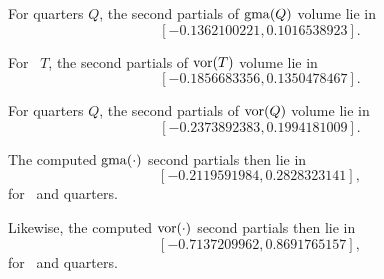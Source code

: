 \begin{calcf}
For quarters $Q$, the second partials of $\operatorname{gma}(Q)$ volume lie in
\[
[-0.1362100221,   0.1016538923].
\]
\label{secpar:gma}
\end{calcf}

\begin{calcf}
For \qrtets\ $T$, the second partials of $\operatorname{vor}(T)$ volume lie in
\[
[-0.1856683356,   0.1350478467].
\]
\label{secpar:vor:qr}
\end{calcf}

\begin{calcf}
For quarters $Q$, the second partials of $\operatorname{vor}(Q)$ volume lie in
\[
[-0.2373892383,   0.1994181009].
\]
\label{secpar:vor}
\end{calcf}

The computed $\operatorname{gma}(\cdot)$ second partials then lie in
\[
[-0.2119591984, 0.2828323141],
\]
for \qrtets\ and quarters.

Likewise, the computed $\operatorname{vor}(\cdot)$ second partials then lie in
\[
[-0.7137209962, 0.8691765157],
\]
for \qrtets\ and quarters.



%
